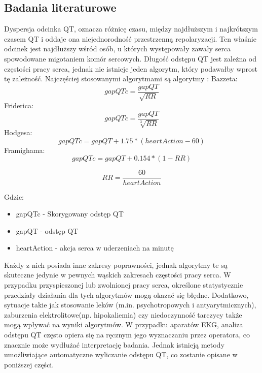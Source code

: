 \subsection{Badania literaturowe}
Dyspersja odcinka QT, oznacza różnicę czasu, między najdłuższym i najkrótszym czasem QT i oddaje ona niejednorodność przestrzenną repolaryzacji. Ten właśnie odcinek jest najdłuższy wśród osób, u których występowały zawały serca spowodowane migotaniem komór sercowych. 
Długość odstępu QT jest zależna od częstości pracy serca, jednak nie istnieje jeden algorytm, który podawałby wprost tę zależność. Najczęściej stosowanymi algorytmami są algorytmy : 
Bazzeta:
\begin{equation}
gapQTc=\frac{gapQT}{\sqrt{RR}}
\end{equation}
Friderica:
\begin{equation}
gapQTc=\frac{gapQT}{\sqrt[3]{RR}}
\end{equation}
Hodgesa:
\begin{equation}
gapQTc=gapQT + 1.75 * (heartAction - 60)
\end{equation}
Framighama:
\begin{equation}
gapQTc=gapQT + 0.154* (1 - RR)
\end{equation}


\begin{equation}
RR = \frac{60}{heartAction}
\end{equation}

Gdzie:
\begin{itemize}
  \item gapQTc - Skorygowany odstęp QT
  \item gapQT - odstęp QT
  \item heartAction - akcja serca w uderzeniach na minutę 
\end{itemize}

Każdy z nich posiada inne zakresy poprawności, jednak algorytmy te są skuteczne jedynie w pewnych wąskich zakresach częstości pracy serca. W przypadku przyspieszonej lub zwolnionej pracy serca, określone statystycznie przedziały działania dla tych algorytmów mogą okazać się błędne. Dodatkowo, sytuacje takie jak  stosowanie leków (m.in. psychotropowych i antyarytmicznych), zaburzenia elektrolitowe(np. hipokaliemia) czy niedoczynność tarczycy także mogą wpływać na wyniki algorytmów. 
W przypadku aparatów EKG, analiza odstępu QT często opiera się na ręcznym jego wyznaczaniu przez operatora, co znacznie może wydłużać interpretację badania. Jednak istnieją metody umożliwiające automatyczne wyliczanie odstępu QT, co zostanie opisane w poniższej części.

